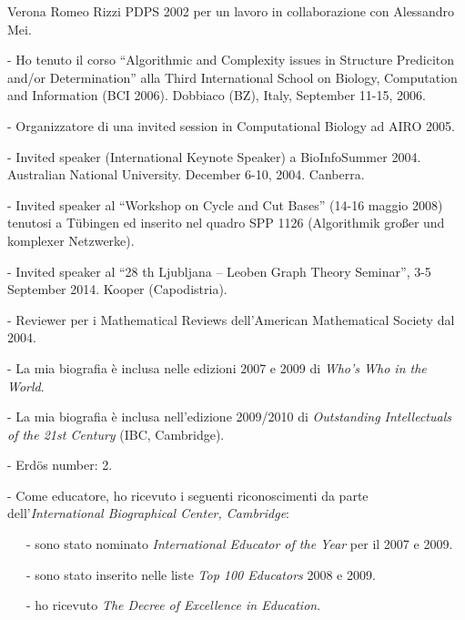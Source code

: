 \vspace{1.2cm}
Verona \hspace{7.8cm} Romeo Rizzi
PDPS 2002
     per un lavoro in collaborazione con Alessandro Mei.

   - Ho tenuto il corso
    ``Algorithmic and Complexity issues in Structure Prediciton and/or Determination''
     alla Third International School on Biology,
     Computation and Information (BCI 2006).
     Dobbiaco (BZ), Italy, September 11-15, 2006.

   - Organizzatore di una invited session in Computational Biology ad AIRO 2005.

   - Invited speaker (International Keynote Speaker) a BioInfoSummer 2004.
Australian National University. December 6-10, 2004. Canberra.

   - Invited speaker al
     ``Workshop on Cycle and Cut Bases'' (14-16 maggio 2008)
     tenutosi a T\"ubingen ed inserito nel quadro
     SPP 1126 (Algorithmik großer und komplexer Netzwerke).

   - Invited speaker al
   ``28 th Ljubljana – Leoben Graph Theory Seminar'',
   3-5 September 2014. Kooper (Capodistria). 

   - Reviewer per i Mathematical Reviews dell'American Mathematical Society
     dal 2004.

   - La mia biografia \`e inclusa nelle edizioni 2007 e 2009
     di \emph{Who's Who in the World}.

   - La mia biografia \`e inclusa nell'edizione 2009/2010
     di \emph{Outstanding Intellectuals of the 21st Century} (IBC, Cambridge).

   - Erd\"os number: 2.

   - Come educatore, ho ricevuto i seguenti riconoscimenti
     da parte dell'\emph{International Biographical Center, Cambridge}:

   \ \ \ - sono stato nominato \emph{International Educator of the Year} per il 2007 e 2009.

   \ \ \ - sono stato inserito nelle liste \emph{Top 100 Educators} 2008
           e 2009.

   \ \ \ - ho ricevuto \emph{The Decree of Excellence in Education}.

   


